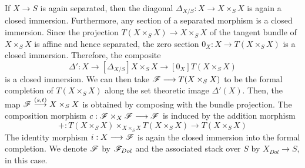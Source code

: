 \documentclass[11pt]{amsart}
\begin{document}
\begin{exm}
\label{exm:Dol-st}
If $X \to S$ is again separated, then the diagonal
$\Delta_{X/S} : X \to X \times_S X$ is again a closed immersion. Furthermore,
any section of a separated morphism is a closed immersion. Since the
projection $T(X \times_S X) \to X \times_S X$ of the tangent bundle of
$X \times_S X$ is affine and hence separated, the zero section
$0_X : X \to T(X \times_S X)$ is a closed immersion. Therefore, the composite
\[
\Delta' : X \to[\Delta_{X/S}] X \times_S X \to[0_X] T(X \times_S X)
\]
is a closed immersion.
We can then take $\sF \to T(X \times_S X)$ to be the
formal completion of $T(X \times_S X)$ along the set theoretic image
$\Delta'(X)$.
Then, the map $\sF \to[{(s, t)}] X \times_S X$ is obtained by
composing with the bundle projection.
The composition morphism $c : \sF \times_X \sF \to \sF$ is induced by
the addition morphism
\[
+ : T(X \times_S X) \times_{X \times_S X} T(X \times_S X) \to T(X \times_S X)
\]
The identity morphism $i : X \to \sF$
is again the closed immersion into the formal completion.
We denote $\mathscr{F}$ by $\mathscr{F}_{Dol}$ and the associated stack over $S$ by
$X_{Dol} \to S$, in this case.
\end{exm}
\end{document}
